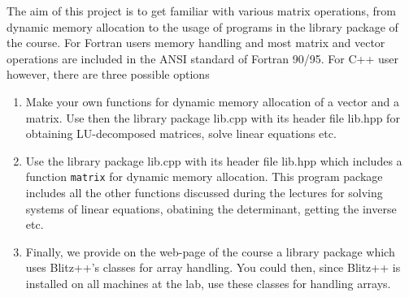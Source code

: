 \documentclass[11pt,a4wide]{article}
\begin{document}
The aim of this project is to get familiar with various matrix operations,
from dynamic memory allocation to the usage of programs in the library
package of the course. 
For Fortran users memory handling and most matrix and vector operations
are included in the ANSI standard of Fortran 90/95. For C++ user however,
there are three possible options
\begin{enumerate}
\item Make your own functions for dynamic memory allocation of a 
vector and a matrix. Use then the 
library package lib.cpp with its header file 
lib.hpp for obtaining LU-decomposed matrices, solve linear equations
etc.
\item Use the library package lib.cpp with its header file 
lib.hpp which includes a function \verb?matrix? for dynamic memory
allocation. This program package includes all the other functions
discussed during the lectures for solving systems of linear equations,
obatining the determinant, getting the inverse etc.
\item Finally, we provide on the web-page of the course a library package
which uses Blitz++'s classes for array handling. You could then, since
Blitz++ is installed on all machines at the lab, use these classes for handling
arrays.
\end{enumerate}
\end{document}
